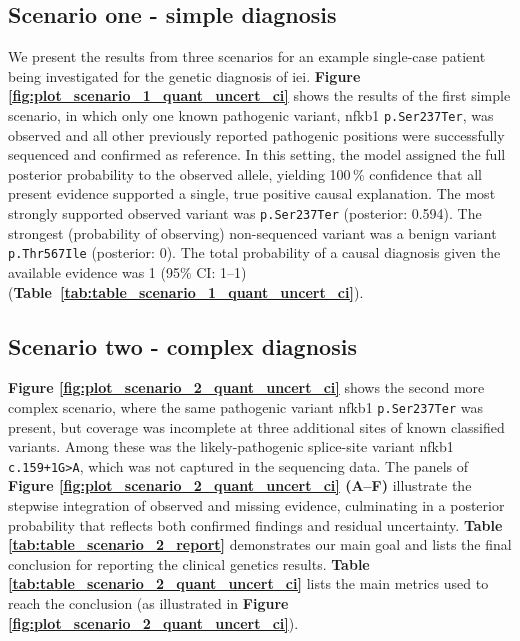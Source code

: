 \subsection{Scenario one - simple diagnosis}
We present the results from three scenarios for an example single-case patient being investigated for the genetic diagnosis of \ac{iei}.
\textbf{Figure \ref{fig:plot_scenario_1_quant_uncert_ci}} shows the results of the first simple scenario, in which only one known pathogenic variant, \ac{nfkb1} \texttt{p.Ser237Ter}, was observed and all other previously reported pathogenic positions were successfully sequenced and confirmed as reference. 
In this setting, the model assigned the full posterior probability to the observed allele, yielding 100\,\% confidence that all present evidence supported a single, true positive causal explanation. 
The most strongly supported observed variant was \texttt{p.Ser237Ter} (posterior: 0.594). 
The strongest (probability of observing) non-sequenced variant was a benign variant \texttt{p.Thr567Ile} (posterior: 0). 
The total probability of a causal diagnosis given the available evidence was 1 (95\% CI: 1--1) (\textbf{Table~\ref{tab:table_scenario_1_quant_uncert_ci}}). 

\subsection{Scenario two - complex diagnosis}

\textbf{Figure \ref{fig:plot_scenario_2_quant_uncert_ci}} shows the second more complex scenario, where the same pathogenic variant \ac{nfkb1} \texttt{p.Ser237Ter} was present, but coverage was incomplete at three additional sites of known classified variants. 
Among these was the likely-pathogenic splice-site variant \ac{nfkb1} \texttt{c.159+1G{\small\textgreater}A}, which was not captured in the sequencing data. 
The panels of \textbf{Figure \ref{fig:plot_scenario_2_quant_uncert_ci} (A–F)} illustrate the stepwise integration of observed and missing evidence, culminating in a posterior probability that reflects both confirmed findings and residual uncertainty.
\textbf{Table \ref{tab:table_scenario_2_report}} demonstrates our main goal and lists the final conclusion for reporting the clinical genetics results.
\textbf{Table \ref{tab:table_scenario_2_quant_uncert_ci}} lists the main metrics used to reach the conclusion (as illustrated in 
\textbf{Figure \ref{fig:plot_scenario_2_quant_uncert_ci}}).

